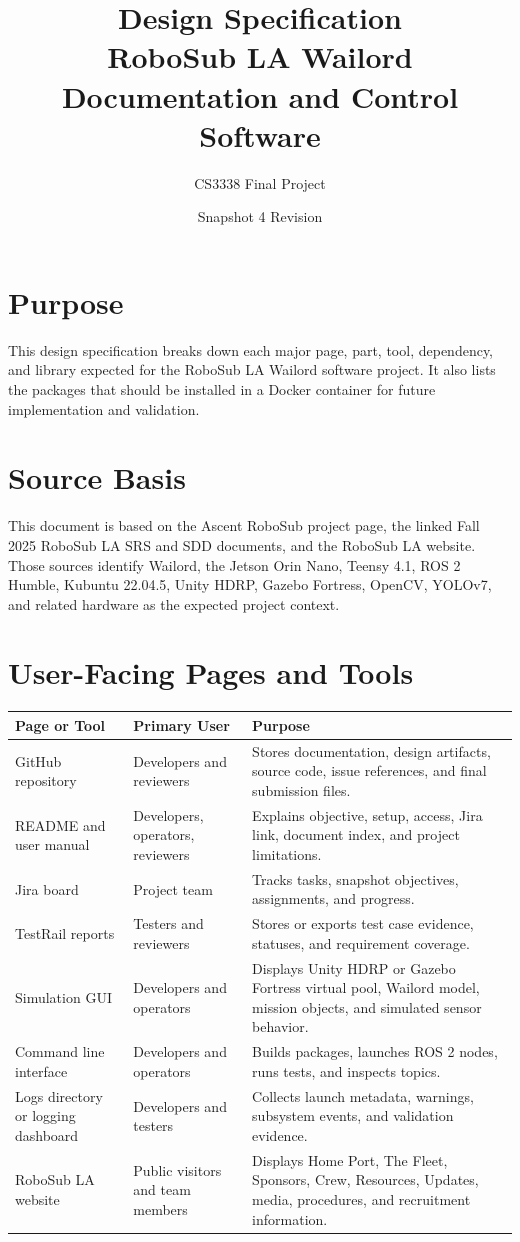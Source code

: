 \documentclass[12pt]{article}
\title{Design Specification\\RoboSub LA Wailord Documentation and Control Software}
\author{CS3338 Final Project}
\date{Snapshot 4 Revision}
\begin{document}
\maketitle
\tableofcontents
\newpage

\section{Purpose}
This design specification breaks down each major page, part, tool, dependency, and library expected for the RoboSub LA Wailord software project. It also lists the packages that should be installed in a Docker container for future implementation and validation.

\section{Source Basis}
This document is based on the Ascent RoboSub project page, the linked Fall 2025 RoboSub LA SRS and SDD documents, and the RoboSub LA website. Those sources identify Wailord, the Jetson Orin Nano, Teensy 4.1, ROS 2 Humble, Kubuntu 22.04.5, Unity HDRP, Gazebo Fortress, OpenCV, YOLOv7, and related hardware as the expected project context.

\section{User-Facing Pages and Tools}
\begin{longtable}{|p{}|p{}|p{}|}
\hline
\textbf{Page or Tool} & \textbf{Primary User} & \textbf{Purpose} \\
\hline
GitHub repository & Developers and reviewers & Stores documentation, design artifacts, source code, issue references, and final submission files. \\
\hline
README and user manual & Developers, operators, reviewers & Explains objective, setup, access, Jira link, document index, and project limitations. \\
\hline
Jira board & Project team & Tracks tasks, snapshot objectives, assignments, and progress. \\
\hline
TestRail reports & Testers and reviewers & Stores or exports test case evidence, statuses, and requirement coverage. \\
\hline
Simulation GUI & Developers and operators & Displays Unity HDRP or Gazebo Fortress virtual pool, Wailord model, mission objects, and simulated sensor behavior. \\
\hline
Command line interface & Developers and operators & Builds packages, launches ROS 2 nodes, runs tests, and inspects topics. \\
\hline
Logs directory or logging dashboard & Developers and testers & Collects launch metadata, warnings, subsystem events, and validation evidence. \\
\hline
RoboSub LA website & Public visitors and team members & Displays Home Port, The Fleet, Sponsors, Crew, Resources, Updates, media, procedures, and recruitment information. \\
\hline
\end{longtable}
\end{document}
